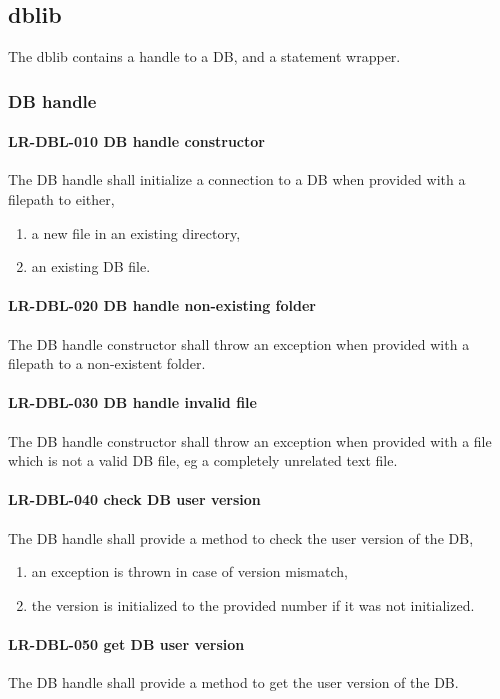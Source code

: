 \subsection{db\textunderscore lib}
The db\textunderscore lib contains a handle to a \gls{DB}, and a statement
wrapper.

\subsubsection{DB handle}
\paragraph{LR-DBL-010 DB handle constructor}
The DB handle shall initialize a connection to a DB when provided
with a filepath to either,
\begin{enumerate}
\item a new file in an existing directory,
\item an existing DB file.
\end{enumerate}

\paragraph{LR-DBL-020 DB handle non-existing folder}
The DB handle constructor shall throw an exception when provided with a filepath
to a non-existent folder.

\paragraph{LR-DBL-030 DB handle invalid file}
The DB handle constructor shall throw an exception when provided with a
file which is not a valid DB file, eg a completely unrelated text file.

\paragraph{LR-DBL-040 check DB user version}
The DB handle shall provide a method to check the user version of the DB,
\begin{enumerate}
\item an exception is thrown in case of version mismatch,
\item the version is initialized to the provided number if it was not
      initialized.
\end{enumerate}

\paragraph{LR-DBL-050 get DB user version}
The DB handle shall provide a method to get the user version of the DB.

